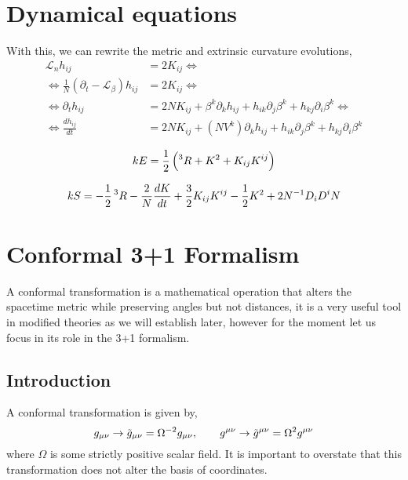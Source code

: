 \section{Dynamical equations}

With this, we can rewrite the metric and extrinsic curvature evolutions,
\begin{align}
    \mathcal{L}_n h_{ij} &= 2K_{ij} \Leftrightarrow\\
    \Leftrightarrow \frac{1}{N}(\partial_t - \mathcal{L}_\beta) h_{ij} &= 2K_{ij} \Leftrightarrow\\
    \label{eqn:general_metric_evolution_basis}
    \Leftrightarrow \partial_t h_{ij} &= 2NK_{ij}+\beta^k \partial_k h_{ij} + h_{ik}\partial_j \beta^k + h_{kj}\partial_i \beta^k\Leftrightarrow\\
    \label{eqn:general_metric_evolution_fluid}
    \Leftrightarrow \frac{d h_{ij}}{dt} &= 2NK_{ij}+(NV^k) \partial_k h_{ij} + h_{ik}\partial_j \beta^k + h_{kj}\partial_i \beta^k
\end{align}




\begin{equation}
    kE=\frac{1}{2}\left(\prescript{3}{}R+K^2+K_{ij}K^{ij}\right)
    \label{eqn:energy_equation}
\end{equation}

\begin{equation}
    kS=-\frac{1}{2}\prescript{3}{}R-\frac{2}{N}\frac{dK}{dt}+\frac{3}{2}K_{ij}K^{ij}-\frac{1}{2}K^2+2N^{-1}D_iD^iN
    \label{eqn:pressure_equation}
\end{equation}


\section{Conformal 3+1 Formalism}

A conformal transformation is a mathematical operation that alters the spacetime metric while preserving angles but not distances, it is a very useful tool in modified theories as we will establish later, however for the moment let us focus in its role in the 3+1 formalism.

\subsection{Introduction}

A conformal transformation is given by,
\begin{equation}
    g_{\mu\nu}\rightarrow \Tilde{g}_{\mu\nu}=\Omega^{-2}g_{\mu\nu}, \qquad g^{\mu\nu}\rightarrow \Tilde{g}^{\mu\nu}=\Omega^{2}g^{\mu\nu}
    \label{eqn:def_conf_transf}
\end{equation}
where $\Omega$ is some strictly positive scalar field. It is important to overstate that this transformation does not alter the basis of coordinates. 

